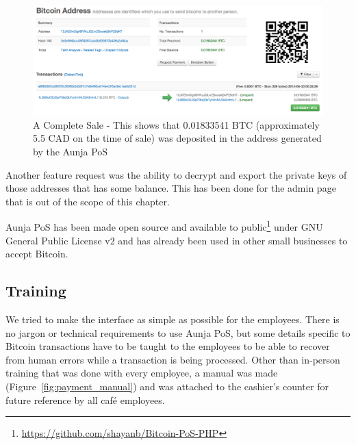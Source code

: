 \begin{figure}
\centering
\includegraphics[width=\linewidth]{fig/complete_sale.png}
  \caption{A Complete Sale - This shows that 0.01833541 BTC (approximately 5.5 CAD on the time of sale) was deposited in the address generated by the Aunja PoS} 
\label{fig:report_page}
\end{figure}


Another feature request was the ability to decrypt and export the private keys of those addresses that has some balance. This has been done for the admin page that is out of the scope of this chapter. 

Aunja PoS has been made open source and available to public\footnote{\url{https://github.com/shayanb/Bitcoin-PoS-PHP}} under GNU General Public License v2 and has already been used in other small businesses to accept Bitcoin.

\subsection{Training}

We tried to make the interface as simple as possible for the employees. There is no jargon or technical requirements to use Aunja PoS, but some details specific to Bitcoin transactions have to be taught to the employees to be able to recover from human errors while a transaction is being processed.
Other than in-person training that was done with every employee, a manual was made (Figure~\ref{fig:payment_manual}) and was attached to the cashier's counter for future reference by all café employees.

